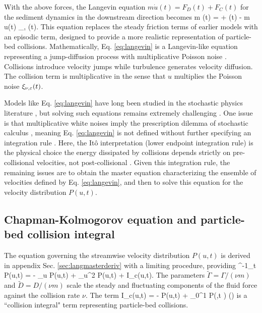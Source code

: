 With the above forces, the Langevin equation $m\dot{u}(t) = F_D(t) + F_C(t)$ for the sediment dynamics in the downstream direction becomes
\be m (t) = \Gamma + \eta(t) - m u(t) \xi_{\nu, \ve}(t). \label{eq:langevin} \ee
This equation replaces the steady friction terms of earlier models with an episodic term, designed to provide a more realistic representation of particle-bed collisions.
Mathematically, Eq. \ref{eq:langevin} is a Langevin-like equation representing a jump-diffusion process \citep{Daly2006} with multiplicative Poisson noise \citep{Dubkov2016,Denisov2009}. 
Collisions introduce velocity jumps while turbulence generates velocity diffusion. The collision term is multiplicative in the sense that $u$ multiplies the Poisson noise $\xi_{\nu,\varepsilon}(t)$.

Models like Eq. \ref{eq:langevin} have long been studied in the stochastic physics literature \citep{Hanggi1978,VanDenBroeck1983}, but solving such equations remains extremely challenging \citep{Daly2010,Mau2014,Dubkov2019}.
One issue is that multiplicative white noises imply the prescription dilemma of stochastic calculus \citep{Risken1989,Gardiner1983}, meaning Eq. \ref{eq:langevin} is not defined without further specifying an integration rule \citep{Suweis2011}.
Here, the It\^{o} interpretation (lower endpoint integration rule) is the physical choice the energy dissipated by collisions depends strictly on pre-collisional velocities, not post-collisional \citep[e.g.][]{Gardiner1983}.
Given this integration rule, the remaining issues are to obtain the master equation characterizing the ensemble of velocities defined by Eq. \ref{eq:langevin}, and then to solve this equation for the velocity distribution $P(u,t)$.

\subsection{Chapman-Kolmogorov equation and particle-bed collision integral}

The equation governing the streamwise velocity distribution $P(u,t)$ is derived in appendix Sec. \ref{sec:langmasterderiv} with a limiting procedure, providing
\be \nu^{-1}\partial_t P(u,t) = - \tilde{\Gamma} \partial_u P(u,t) +  \partial_u^2 P(u,t) + I_c(u,t). \label{eq:master} \ee
The parameters $\tilde{\Gamma} = \Gamma/(\nu m)$ and $\tilde{D} = D/(\nu m)$ scale the steady and fluctuating components of the fluid force against the collision rate $\nu$. The term
\be I_c(u,t) = - P(u,t) + \int_0^1 P\big(,t \big) \rho(\ve) \label{eq:colint} \ee
is a ``collision integral" term representing particle-bed collisions.

